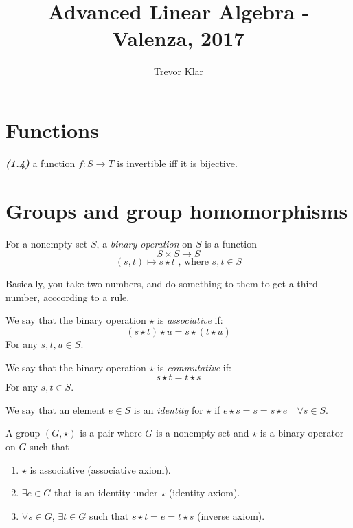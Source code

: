 \documentclass[a5paper]{article}
\title{Advanced Linear Algebra - Valenza, 2017}
\author{Trevor Klar}
\begin{document}
\maketitle

\section{Functions}

\begin{theorem*}\emph{\textbf{(1.4)}}
a function $f:S \to T$ is invertible iff it is bijective.
\end{theorem*}

\section{Groups and group homomorphisms}

For a  nonempty set $S$, a \emph{binary operation} on $S$ is a function
$$ S \times S \to S $$
$$ (s,t) \mapsto s\star t\text{ , where }s,t \in S$$

\noindent Basically, you take two numbers, and do something to them to get a third number, acccording to a rule. 

\begin{definition*}
We say that the binary operation $\star$ is \emph{associative} if:
$$(s\star t)\star u = s\star (t\star u)$$
For any $s,t,u \in S$.
\end{definition*}

\begin{definition*}
We say that the binary operation $\star$ is \emph{commutative} if:
$$s\star t= t\star s$$
For any $s,t \in S$.
\end{definition*}

\begin{definition*}
We say that an element $e \in S$ is an \emph{identity} for $\star$ if $e\star s = s = s\star e \quad \forall s \in S$. 
\end{definition*}

\clearpage

\begin{definition*}
A group $(G,\star)$ is a pair where $G$ is a nonempty set and $\star$ is a binary operator on $G$ such that 
\begin{enumerate}
\item $\star$ is associative (associative axiom). 
\item $\exists e \in G$ that is an identity under $\star$ (identity axiom).
\item $\forall s \in G$, $\exists t \in G$ such that $s\star t = e = t \star s$ (inverse axiom).
\end{enumerate}
\end{definition*}
\end{document}
